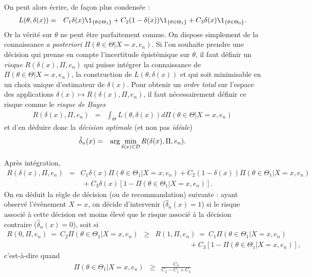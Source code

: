 On peut alors écrire, de fa\c con plus condensée :
\begin{eqnarray}
L(\theta,\delta(x)) & = & %
C_1\delta(x)\1_{\{\theta\in\Theta_1\}}  + C_2(1-\delta(x))\1_{\{\theta\in\Theta_1\}} + C_3\delta(x)\1_{\{\theta\in\Theta_0\}}. \label{f.cout}
\end{eqnarray}
Or la vérité sur $\theta$ ne peut être parfaitement connue. On dispose simplement de la connaissance {\it a posteriori} $\Pi(\theta\in\Theta|X=x,e_n)$. Si l'on souhaite prendre une décision qui prenne en compte l'incertitude épistémique sur $\theta$, il faut définir un {\it risque} $R(\delta(x),\Pi,e_n)$ qui puisse intégrer la connaissance de $\Pi(\theta\in\Theta|X=x,e_n)$, la construction de $L(\theta,\delta(x))$ et qui soit minimisable en un choix unique d'estimateur de $\delta(x)$. Pour obtenir un {\it ordre total} sur l'espace des applications $\delta(x)\mapsto R(\delta(x),\Pi,e_n)$, il faut nécessairement définir ce risque comme le {\it risque de Bayes} 
\begin{eqnarray*}
R(\delta(x),\Pi,e_n) & = & \int_{\Theta} L(\theta,\delta(x)) d\Pi(\theta\in\Theta|X=x,e_n)
\end{eqnarray*}
et d'en déduire donc la {\it décision optimale} (et non pas {\it idéale})
\begin{eqnarray*}
\hat{\delta}_n(x) & = & \arg\min\limits_{\delta(x)\in{\cal{D}}} R(\delta(x),\Pi,e_n).
\end{eqnarray*}       

Après intégration,
\begin{eqnarray*}
R(\delta(x),\Pi,e_n) & = & C_1\delta(x)\Pi(\theta\in\Theta_1|X=x,e_n) + C_2(1-\delta(x))\Pi(\theta\in\Theta_1|X=x,e_n)  \\
& & \ + C_3\delta(x)\left[1-\Pi(\theta\in\Theta_1|X=x,e_n)\right].
\end{eqnarray*}
On en déduit la règle de décision (ou de recommandation) suivante : ayant observé l'évènement $X=x$, on décide d'intervenir ($\hat{\delta}_n(x)=1$) si le risque associé à cette décision est moins élevé que le risque associé à la décision contraire ($\hat{\delta}_n(x)=0$), soit si 
\begin{eqnarray*}
R(0,\Pi,e_n) \ = \ C_2 \Pi(\theta\in\Theta_1|X=x,e_n)  &  \geq & R(1,\Pi,e_n) \ = \ C_1\Pi(\theta\in\Theta_1|X=x,e_n) \\
& & \hspace{2cm} + C_3\left[1-\Pi(\theta\in\Theta_1|X=x,e_n)\right],
\end{eqnarray*}
c'est-à-dire quand 
\begin{eqnarray}
\Pi(\theta\in\Theta_1|X=x,e_n) & \geq & \frac{C_3}{C_2-C_1+C_3} \label{bonne.regle}
\end{eqnarray}

